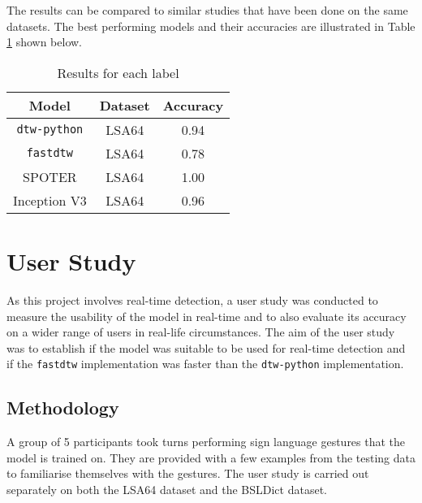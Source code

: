 \documentclass[final,rdr32.tex]{subfiles}
\begin{document}
The results can be compared to similar studies that have been done on the same datasets. The best performing models and their accuracies are illustrated in Table \ref{tab:studies} shown below.

\begin{table}[H]
    \begin{center}
        \begin{tabular}{ |c|c|c| }
            \hline
            Model                              & Dataset & Accuracy \\
            \hline
            \verb|dtw-python|                  & LSA64   & 0.94     \\
            \verb|fastdtw|                     & LSA64   & 0.78     \\
            SPOTER \cite{bohavcek2022sign}     & LSA64   & 1.00     \\
            Inception V3 \cite{rajput2022sign} & LSA64   & 0.96     \\
            \hline
        \end{tabular}
    \end{center}
    \caption{Results for each label}
    \label{tab:studies}
\end{table}

\section{User Study}

As this project involves real-time detection, a user study was conducted to measure the usability of the model in real-time and to also evaluate its accuracy on a wider range of users in real-life circumstances. The aim of the user study was to establish if the model was suitable to be used for real-time detection and if the \verb|fastdtw| implementation was faster than the \verb|dtw-python| implementation.

\subsection{Methodology}

A group of 5 participants took turns performing sign language gestures that the model is trained on. They are provided with a few examples from the testing data to familiarise themselves with the gestures. The user study is carried out separately on both the LSA64 dataset and the BSLDict dataset.

\end{document}
